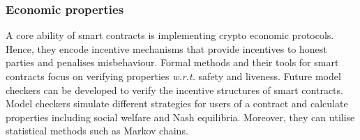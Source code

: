 \subsubsection{Economic properties}
A core ability of smart contracts is implementing crypto economic protocols.
Hence, they encode incentive mechanisms that provide incentives to honest parties and penalises misbehaviour.
Formal methods and their tools for smart contracts focus on verifying properties \emph{w.r.t.} safety and liveness.
Future model checkers can be developed to verify the incentive structures of smart contracts.
Model checkers simulate different strategies for users of a contract and calculate properties including social welfare and Nash equilibria.
Moreover, they can utilise statistical methods such as Markov chains.







